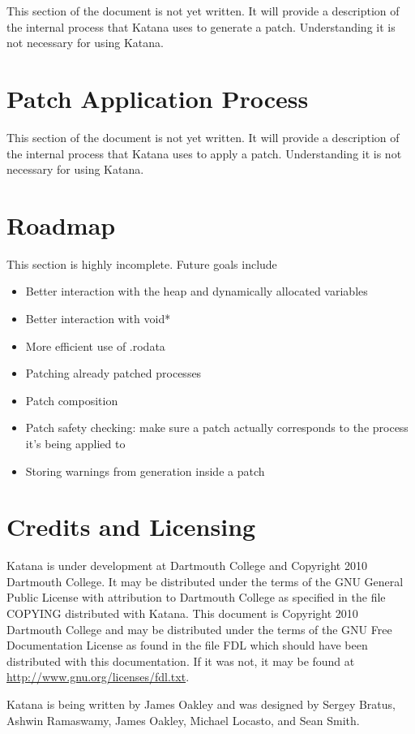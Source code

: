 \documentclass[11pt]{article}
\begin{document}
  This section of the document is not yet written. It will provide a
  description of the internal process that Katana uses to generate a
  patch. Understanding it is not necessary for using Katana.
\section{Patch Application Process}
\label{sec-9}

  This section of the document is not yet written. It will provide a
  description of the internal process that Katana uses to apply a
  patch. Understanding it is not necessary for using Katana.
\section{Roadmap}
\label{sec-10}

  This section is highly incomplete. Future goals include
\begin{itemize}
\item Better interaction with the heap and dynamically allocated variables
\item Better interaction with void*
\item More efficient use of .rodata
\item Patching already patched processes
\item Patch composition
\item Patch safety checking: make sure a patch actually corresponds to
    the process it's being applied to
\item Storing warnings from generation inside a patch
\end{itemize}
\section{Credits and Licensing}
\label{sec-11}

  Katana is under development at Dartmouth College and Copyright 2010
  Dartmouth College. It may be distributed under the terms of the GNU
  General Public License with attribution to Dartmouth College as
  specified in the file COPYING distributed with Katana. This document
  is Copyright 2010 Dartmouth College and may be distributed under the
  terms of the GNU Free Documentation License as found in the file FDL
  which should have been distributed with this documentation. If it
  was not, it may be found at \href{http://www.gnu.org/licenses/fdl.txt}{http://www.gnu.org/licenses/fdl.txt}.

  Katana is being written by James Oakley and was designed
  by Sergey Bratus, Ashwin Ramaswamy, James Oakley, Michael Locasto,
  and Sean Smith.
\end{document}
